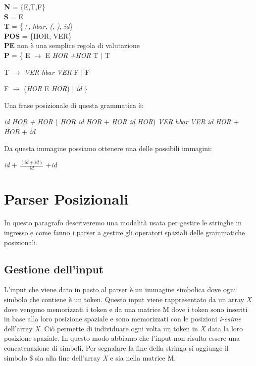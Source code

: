\begin{center}
	\textbf{N} = \{E,T,F\} \\
	\textbf{S} = E  \\
	\textbf{T} =  \{\textit{+}, \textit{hbar}, \textit{(}, \textit{)}, \textit{id}\} \\
	\textbf{POS}  = \{HOR, VER\}\\
	\textbf{PE} non è una semplice regola di valutazione\\
	\textbf{P}   = \{ E $\to$ E \textit{HOR} \textit{+}\textit{HOR} T $\mid$ T \par 
	         \hspace{1.1cm}T $\to$ \textit{VER} \textit{hbar} \textit{VER} F $\mid$ F \par 
	         \hspace{1.1cm} F $\to$ (\textit{HOR} E \textit{HOR}) $\mid$ \textit{id}  \}   
\end{center}
Una frase posizionale di questa grammatica è:
\begin{center}
	\textit{id} \textit{HOR} \textit{+} \textit{HOR} ( \textit{HOR} \textit{id} \textit{HOR} + \textit{HOR} \textit{id} \textit{HOR}) \textit{VER} \textit{hbar} \textit{VER} \textit{id} \textit{HOR} + \textit{HOR} + \textit{id}
\end{center}
Da questa immagine possiamo ottenere una delle possibili immagini:
\begin{center}
	 \textit{id} + $\frac{(\textit{id} + \textit{id})}{\textit{id}}$ +\textit{id}
\end{center}
\section{Parser Posizionali}
In questo paragrafo descriveremo una modalità usata per gestire le stringhe in ingresso e come fanno i parser a gestire gli operatori spaziali delle grammatiche posizionali.
\subsection{Gestione dell'input}
L'input che viene dato in pasto al parser è un immagine simbolica dove ogni simbolo che contiene è un token. Questo input viene rappresentato da un array \textit{X} dove vengono memorizzati i token e da una matrice M dove i token sono inseriti in base alla loro posizione spaziale e sono memorizzati con le posizioni \textit{i-esime} dell'array \textit{X}. Ciò permette di individuare ogni volta un token in \textit{X} data la loro posizione spaziale. In questo modo abbiamo che l'input non risulta essere una concatenazione di simboli. Per segnalare la fine della stringa si aggiunge il simbolo $\$$ sia alla fine dell'array \textit{X} e sia nella matrice M.
